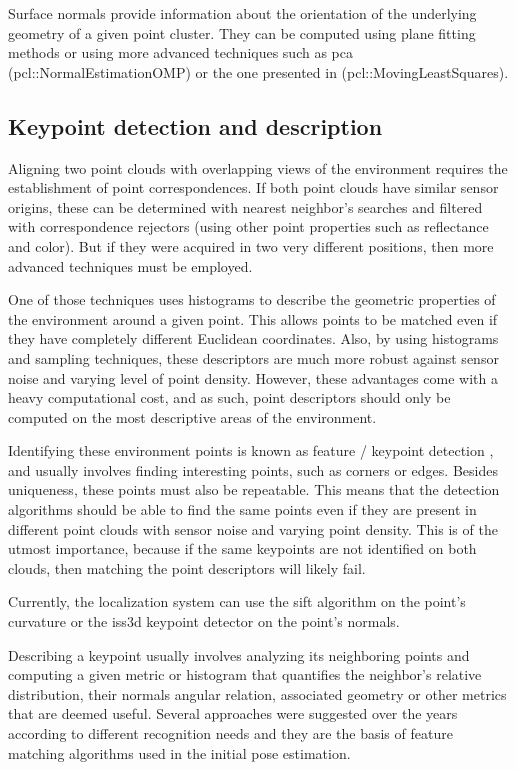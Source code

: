 Surface normals provide information about the orientation of the underlying geometry of a given point cluster. They can be computed using plane fitting methods or using more advanced techniques such as \gls{pca} \cite{Jolliffe2002} (pcl::NormalEstimationOMP) or the one presented in  (pcl::MovingLeastSquares).


\subsection{Keypoint detection and description}

Aligning two point clouds with overlapping views of the environment requires the establishment of point correspondences. If both point clouds have similar sensor origins, these can be determined with nearest neighbor's searches and filtered with correspondence rejectors (using other point properties such as reflectance and color). But if they were acquired in two very different positions, then more advanced techniques must be employed.

One of those techniques uses histograms to describe the geometric properties of the environment around a given point. This allows points to be matched even if they have completely different Euclidean coordinates. Also, by using histograms and sampling techniques, these descriptors are much more robust against sensor noise and varying level of point density. However, these advantages come with a heavy computational cost, and as such, point descriptors should only be computed on the most descriptive areas of the environment.

Identifying these environment points is known as feature / keypoint detection \cite{Filipe2014a}, and usually involves finding interesting points, such as corners or edges. Besides uniqueness, these points must also be repeatable. This means that the detection algorithms should be able to find the same points even if they are present in different point clouds with sensor noise and varying point density. This is of the utmost importance, because if the same keypoints are not identified on both clouds, then matching the point descriptors will likely fail.

Currently, the localization system can use the \gls{sift} \cite{Lowe2004} algorithm on the point's curvature or the \gls{iss3d} \cite{Zhong2009} keypoint detector on the point's normals.

Describing a keypoint usually involves analyzing its neighboring points and computing a given metric or histogram that quantifies the neighbor's relative distribution, their normals angular relation, associated geometry or other metrics that are deemed useful. Several approaches were suggested over the years according to different recognition needs and they are the basis of feature matching algorithms used in the initial pose estimation.

